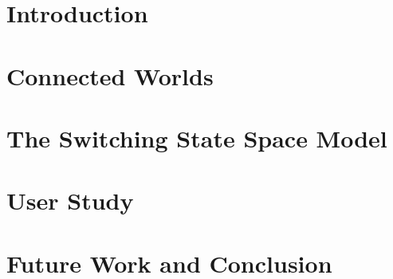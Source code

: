 \documentclass[11pt]{gsasthesis} %
\begin{document}
\chapter*{Introduction}\label{ch:intro}



\chapter{Connected Worlds}\label{ch:1}




\chapter{The Switching State Space Model}\label{ch:2}




\chapter{User Study}\label{ch:3}




\chapter{Future Work and Conclusion}\label{ch:4}




\begin{singlespacing}
  \renewcommand{\bibname}{References}

  
  
\end{singlespacing}


\end{document}
